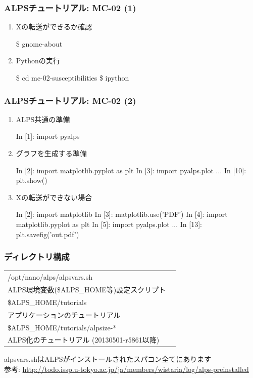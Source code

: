 \begin{frame}[fragile]
  \frametitle{ALPSチュートリアル: MC-02 (1)}
  \begin{enumerate}
  \item<1-> Xの転送ができるか確認
\begin{semiverbatim}
 \$ gnome-about
\end{semiverbatim}
  \item<1-> Pythonの実行
\begin{semiverbatim}
 \$ cd mc-02-susceptibilities
 \$ ipython
\end{semiverbatim}
  \end{enumerate}
\end{frame}

\begin{frame}[fragile,shrink=5]
  \frametitle{ALPSチュートリアル: MC-02 (2)}
  \begin{enumerate}
  \item<2-> ALPS共通の準備
\begin{semiverbatim}
In [1]: import pyalps
\end{semiverbatim}
  \item<3-> グラフを生成する準備
\begin{semiverbatim}
In [2]: import matplotlib.pyplot as plt
In [3]: import pyalps.plot
...
In [10]: plt.show()
\end{semiverbatim}
  \item<3-> Xの転送ができない場合
\begin{semiverbatim}
In [2]: import matplotlib
In [3]: matplotlib.use('PDF')
In [4]: import matplotlib.pyplot as plt
In [5]: import pyalps.plot
...
In [13]: plt.savefig('out.pdf')
\end{semiverbatim}
  \end{enumerate}
\end{frame}

\begin{frame}
  \frametitle{ディレクトリ構成}
  \begin{tabular}{ll}
    /opt/nano/alps/alpsvars.sh & \\
    \hspace*{3em} ALPS環境変数(\$ALPS\_HOME等)設定スクリプト \\
    \$ALPS\_HOME/tutorials & \\
    \hspace*{3em} アプリケーションのチュートリアル \\
    \$ALPS\_HOME/tutorials/alpsize-* & \\
    \hspace*{3em} ALPS化のチュートリアル (20130501-r5861以降)
  \end{tabular}
  \begin{alertblock}{}
    alpsvars.shはALPSがインストールされたスパコン全てにあります \\
    参考: {\footnotesize \url{http://todo.issp.u-tokyo.ac.jp/ja/members/wistaria/log/alps-preinstalled}}
\end{alertblock}
\end{frame}



